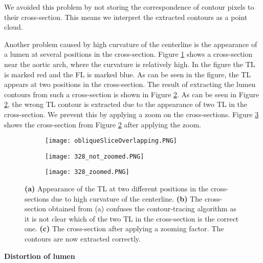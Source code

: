\documentclass[thesis.tex]{subfiles}
\begin{document}
We avoided this problem by not storing the correspondence of contour pixels to their cross-section. This means we interpret the extracted contours as a point cloud.

Another problem caused by high curvature of the centerline is the appearance of a lumen at several positions in the cross-section. Figure \ref{fig:overlappingCase} shows a cross-section near the aortic arch, where the curvature is relatively high. In the figure the TL is marked red and the FL is marked blue. As can be seen in the figure, the TL appears at two positions in the cross-section. The result of extracting the lumen contours from such a cross-section is shown in Figure \ref{fig:overlappingCrossection}. As can be seen in Figure \ref{fig:overlappingCrossection}, the wrong TL contour is extracted due to the appearance of two TL in the cross-section. We prevent this by applying a zoom on the cross-sections. Figure \ref{fig:overlappingCrosssectionZoomed} shows the cross-section from Figure \ref{fig:overlappingCrossection} after applying the zoom.

\begin{figure}
	\begin{subfigure}{\textwidth}
		\texttt{[image: obliqueSliceOverlapping.PNG]}
		
	\caption{}	
\label{fig:overlappingCase}	
	\end{subfigure}
	\begin{subfigure}[t]{0.45\textwidth}
		\texttt{[image: 328\_not\_zoomed.PNG]}
			
\caption{}	
\label{fig:overlappingCrossection}	
	\end{subfigure}
\centering
\hspace{0.08\textwidth}
\begin{subfigure}[t]{0.45\textwidth}
		\texttt{[image: 328\_zoomed.PNG]}		
\caption{}	
\label{fig:overlappingCrosssectionZoomed}
	\end{subfigure}
	\caption{\textbf{(a)} Appearance of the TL at two different positions in the cross-sections due to high curvature of the centerline. \textbf{(b)} The cross-section obtained from (a) confuses the contour-tracing algorithm as it is not clear which of the two TL in the cross-section is the correct one. \textbf{(c)} The cross-section after applying a zooming factor. The contours are now extracted correctly.}
\label{fig:overlapping}
\end{figure}


\textbf{Distortion of lumen} 
\end{document}
